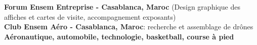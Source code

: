 \documentclass{src/classes/resume}
\begin{document}
\def\centerOfInterest{
\textbf{Forum Ensem Entreprise - Casablanca, Maroc} (Design graphique des affiches et cartes de visite, accompagnement exposants)\\
\textbf{Club Ensem Aéro - Casablanca, Maroc}: recherche et assemblage de drônes\\
\textbf{Aéronautique, automobile, technologie, basketball, course à pied}
}


\candidatepresentation

\eduEnsem
\eduDd
\eduCpge

\xpPhimeca
\xpDpw

\projectBE
\projectRecAcad
\projectEndStudies
\projectMode

\vspace{0.3em}
\technicalSkills

\vspace{0.3em}
\langagesSkills

\vspace{0.3em}
\centerOfInterest
\end{document}
